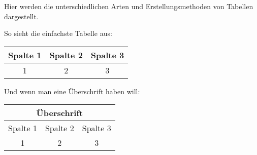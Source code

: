 \documentclass[a4paper, 12pt]{article}
\begin{document}
Hier werden die unterschiedlichen Arten und Erstellungsmethoden von Tabellen dargestellt.

So sieht die einfachste Tabelle aus:

\begin{tabular}{|c|c|c|}
\hline
Spalte 1 & Spalte 2 & Spalte 3 \\
\hline
1 & 2 & 3 \\
\hline
\end{tabular}

Und wenn man eine Überschrift haben will:

\begin{tabular}{|c|c|c|}
\hline
\multicolumn{3}{|c|}{Überschrift}\\
\hline
Spalte 1 & Spalte 2 & Spalte 3 \\
\hline
1 & 2 & 3 \\
\hline
\end{tabular}
\end{document}
